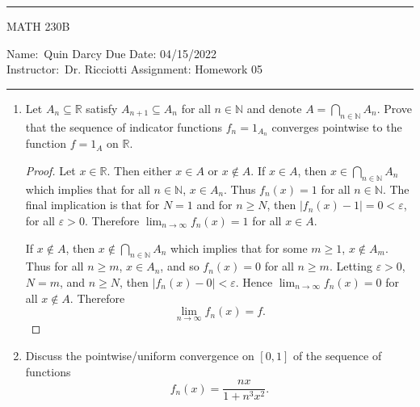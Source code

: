 \documentclass[12pt]{article}
\begin{document}
    \thispagestyle{empty}\hrule

    \begin{center}
        \vspace{.4cm} { \large MATH 230B}
    \end{center}
    {Name:\ Quin Darcy \hspace{\fill} Due Date: 04/15/2022   \\
    { Instructor:}\ Dr. Ricciotti \hspace{\fill} Assignment:
    Homework 05 \\ \hrule}

    \begin{enumerate}
        \item Let $A_n\subseteq\mathbb{R}$ satisfy $A_{n+1}\subseteq A_n$ for
            all $n\in\mathbb{N}$ and denote $A=\bigcap_{n\in\mathbb{N}}A_n$.
            Prove that the sequence of indicator functions $f_n=1_{A_n}$
            converges pointwise to the function $f=1_A$ on $\mathbb{R}$. 
            \begin{proof}
                Let $x\in\mathbb{R}$. Then either $x\in A$ or $x\notin A$. If
                $x\in A$, then $x\in\bigcap_{n\in\mathbb{N}}A_n$ which implies
                that for all $n\in\mathbb{N}$, $x\in A_n$. Thus $f_n(x)=1$ for
                all $n\in\mathbb{N}$. The final implication is that for $N=1$
                and for $n\geq N$, then $|f_n(x)-1|=0<\varepsilon$, for all
                $\varepsilon>0$. Therefore $\lim_{n\to\infty}f_n(x)=1$ for all
                $x\in A$.\par\hspace{4mm} If $x\notin A$, then
                $x\notin\bigcap_{n\in\mathbb{N}}A_n$ which implies that for
                some $m\geq 1$, $x\notin A_m$. Thus for all $n\geq m$, $x\in
                A_n$, and so $f_n(x)=0$ for all $n\geq m$. Letting
                $\varepsilon>0$, $N=m$, and $n\geq N$, then
                $|f_n(x)-0|<\varepsilon$. Hence $\lim_{n\to\infty}f_n(x)=0$ for
                all $x\notin A$. Therefore 
                \begin{equation*}
                    \lim_{n\to\infty}f_n(x)=f.
                \end{equation*}
            \end{proof}
        \item Discuss the pointwise/uniform convergence on $[0, 1]$ of the
            sequence of functions 
            \begin{equation*}
                f_n(x)=\frac{nx}{1+n^3x^2}.

\end{equation*}
\end{enumerate}
\end{document}
